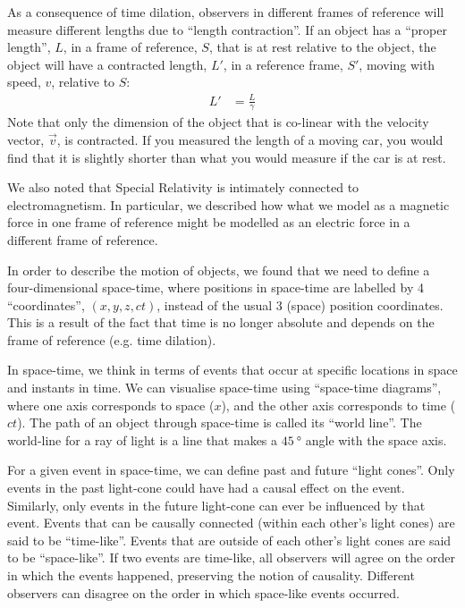 \begin{chapterSummary}
As a consequence of time dilation, observers in different frames of reference will measure different lengths due to ``length contraction''. If an object has a ``proper length'', $L$, in a frame of reference, $S$, that is at rest relative to the object, the object will have a contracted length, $L'$, in a reference frame, $S'$, moving with speed, $v$, relative to $S$:
\begin{align*}
L'&=\frac{L}{\gamma}
\end{align*} 
Note that only the dimension of the object that is co-linear with the velocity vector, $\vec v$, is contracted. If you measured the length of a moving car, you would find that it is slightly shorter than what you would measure if the car is at rest.

We also noted that Special Relativity is intimately connected to electromagnetism. In particular, we described how what we model as a magnetic force in one frame of reference might be modelled as an electric force in a different frame of reference.

In order to describe the motion of objects, we found that we need to define a four-dimensional space-time, where positions in space-time are labelled by 4 ``coordinates'', $(x,y,z,ct)$, instead of the usual 3 (space) position coordinates. This is a result of the fact that time is no longer absolute and depends on the frame of reference (e.g. time dilation). 

In space-time, we think in terms of events that occur at specific locations in space and instants in time. We can visualise space-time using ``space-time diagrams'', where one axis corresponds to space ($x$), and the other axis corresponds to time ($ct$). The path of an object through space-time is called its ``world line''. The world-line for a ray of light is a line that makes a $\SI{45}{\degree}$ angle with the space axis. 

For a given event in space-time, we can define past and future ``light cones''. Only events in the past light-cone could have had a causal effect on the event. Similarly, only events in the future light-cone can ever be influenced by that event. Events that can be causally connected (within each other's light cones) are said to be ``time-like''. Events that are outside of each other's light cones are said to be ``space-like''. If two events are time-like, all observers will agree on the order in which the events happened, preserving the notion of causality. Different observers can disagree on the order in which space-like events occurred. 


\end{chapterSummary}
